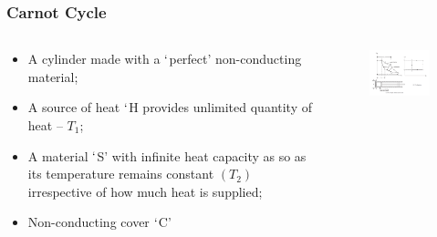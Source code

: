 \documentclass[10pt,compress]{beamer}
\begin{document}
\begin{frame}
 \frametitle{Carnot Cycle}
 \begin{columns}
  \begin{column}[c]{0.4\linewidth}
   \begin{itemize}
    \item <1-> A cylinder made with a $\lq$perfect' non-conducting material;
    \item <2-> A source of heat $\lq$H provides unlimited quantity of heat -- $T_{1}$;
    \item <3-> A material $\lq$S' with infinite heat capacity as so as its temperature remains constant $\left(T_{2}\right)$ irrespective of how much heat is supplied;
    \item <4-> Non-conducting cover $\lq$C'
   \end{itemize}
  \end{column}
  \begin{column}[c]{0.6\linewidth}
   \begin{figure}%
    \begin{center}
     \includegraphics[width=7.5cm,clip]{./Pics/GasCycle_CarnotCycle}
    \end{center}
   \end{figure}  
  \end{column}  
 \end{columns}
\end{frame}
\end{document}
